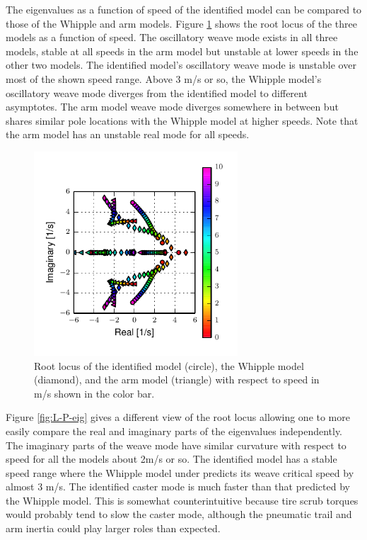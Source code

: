 \documentclass[a4paper]{article}
\begin{document}
The eigenvalues as a function of speed of the identified model can be compared
to those of the Whipple and arm models. Figure \ref{fig:L-P-rlocus} shows the
root locus of the three models as a function of speed. The oscillatory weave
mode exists in all three models, stable at all speeds in the arm model but
unstable at lower speeds in the other two models. The identified model's
oscillatory weave mode is unstable over most of the shown speed range. Above 3
m/s or so, the Whipple model's oscillatory weave mode diverges from the
identified model to different asymptotes. The arm model weave mode diverges
somewhere in between but shares similar pole locations with the Whipple model
at higher speeds. Note that the arm model has an unstable real mode for all
speeds.

\begin{figure}
  \centering
  \includegraphics[width=3in]{figures/L-P-rlocus.pdf}
  \caption{Root locus of the identified model (circle), the Whipple model
    (diamond), and the arm model (triangle) with respect to speed in m/s shown
    in the color bar.}
  \label{fig:L-P-rlocus}
\end{figure}

Figure \ref{fig:L-P-eig} gives a different view of the root locus allowing one
to more easily compare the real and imaginary parts of the eigenvalues
independently. The imaginary parts of the weave mode have similar curvature
with respect to speed for all the models about 2m/s or so. The identified model
has a stable speed range where the Whipple model under predicts its weave
critical speed by almost 3 m/s. The identified caster mode is much faster than
that predicted by the Whipple model. This is somewhat counterintuitive
because tire scrub torques would probably tend to slow the caster mode, although 
the pneumatic trail and  arm inertia could play larger
roles than expected.
\end{document}

